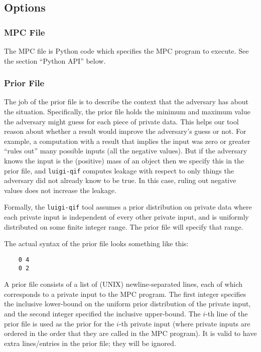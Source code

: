\documentclass[11pt]{article}
\begin{document}
\subsection{Options}
\subsubsection*{MPC File}
The MPC file is Python code which specifies the MPC program to execute. See the section ``Python API'' below.

\subsubsection*{Prior File}
The job of the prior file is to describe the context that the adversary has about the situation.
Specifically, the prior file holds the minimum and maximum value the adversary might guess for each piece of private data.
This helps our tool reason about whether a result would improve the adversary's guess or not.
For example, a computation with a result that implies the input was zero or greater ``rules out'' many possible inputs (all the negative values).
But if the adversary knows the input is the (positive) mass of an object then we specify this in the prior file, and \texttt{luigi-qif} computes leakage with respect to only things the adversary did not already know to be true.
In this case, ruling out negative values does not increase the leakage.

Formally, the \texttt{luigi-qif} tool assumes a prior distribution on private data where each private input is independent of every other private input, and is uniformly distributed on some finite integer range. The prior file will specify that range.

The actual syntax of the prior file looks something like this:
\begin{verbatim}
    0 4
    0 2
\end{verbatim}

A prior file consists of a list of (UNIX) newline-separated lines, each of which corresponds to a private input to the MPC program. The first integer specifies the inclusive lower-bound on the uniform prior distribution of the private input, and the second integer specified the inclusive upper-bound. The $i$-th line of the prior file is used as the prior for the $i$-th private input (where private inputs are ordered in the order that they are called in the MPC program). It is valid to have extra lines/entries in the prior file; they will be ignored.
\end{document}

